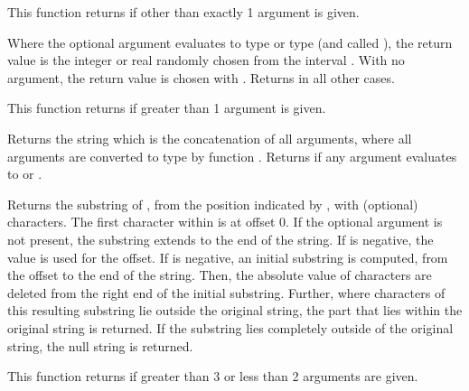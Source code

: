 \begin{description}
    This function returns  if other than exactly 1
    argument is given.

  \item[\Code{Integer random(\Lbr\ AnyType Expr \Rbr)}]
    Where the optional argument  evaluates to type 
    or type 
    (and called ),
    the return value is the integer or real  randomly chosen
    from the interval .
    With no argument, the return value is chosen with .
    Returns  in all other cases.

    This function returns  if greater than 1
    argument is given.

  \item[\Code{String strcat(AnyType Expr1 \Lbr\ , AnyType Expr2 \Dots \Rbr)}]
    Returns the string which is the concatenation of all arguments, where all arguments are 
    converted to type  by function .
    Returns  if any argument evaluates to  or .

  \item[\Code{String substr(String s, Integer offset \Lbr\ , Integer length  \Rbr)}]
    Returns the substring of , from the position indicated by ,
    with (optional)  characters.
    The first character within  is at offset 0.
    If the optional  argument is not present, the substring extends to the
    end of the string.
    If  is negative, the value  is used for the offset.
    If  is negative, an initial substring is computed, from the offset
    to the end of the string.
    Then, the absolute value of  characters are deleted from the
    right end of the initial substring.
    Further, where characters of this resulting substring lie outside the original
    string, the part that lies within the original string is returned.
    If the substring lies completely outside of the original string, the null string
    is returned.

    This function returns  if greater than 3 or less than 2
    arguments are given.
    

\end{description}
